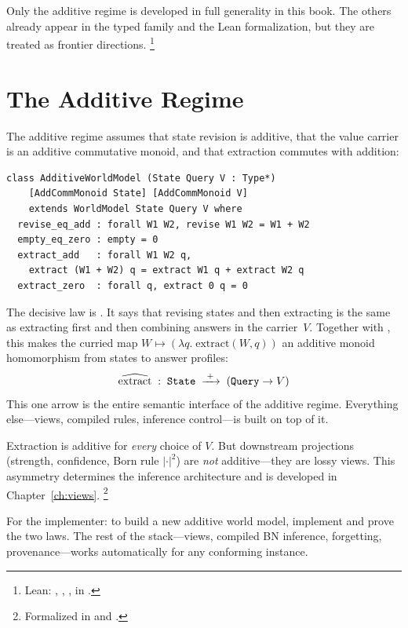 \documentclass[11pt,openany]{report}
\begin{document}
\noindent
Only the additive regime is developed in full generality in this book.
The others already appear in the typed family and the Lean
formalization, but they are treated as frontier directions.%
\footnote{Lean: , ,
,  in
.}


\section{The Additive Regime}
\label{sec:additive-regime}

The additive regime assumes that state revision is additive, that the
value carrier is an additive commutative monoid, and that extraction
commutes with addition:

\begin{lstlisting}[language={}]
class AdditiveWorldModel (State Query V : Type*)
    [AddCommMonoid State] [AddCommMonoid V]
    extends WorldModel State Query V where
  revise_eq_add : forall W1 W2, revise W1 W2 = W1 + W2
  empty_eq_zero : empty = 0
  extract_add   : forall W1 W2 q,
    extract (W1 + W2) q = extract W1 q + extract W2 q
  extract_zero  : forall q, extract 0 q = 0
\end{lstlisting}

\noindent
The decisive law is .  It says that revising states
and then extracting is the same as extracting first and then combining
answers in the carrier~$V$.  Together with , this
makes the curried map
$W \mapsto (\lambda q.\; \mathrm{extract}(W, q))$ an additive monoid
homomorphism from states to answer profiles:
\[
  \widehat{\mathrm{extract}} \;:\;
  \texttt{State} \;\xrightarrow{\;+\;}\;
  (\texttt{Query} \to V)
\]
This one arrow is the entire semantic interface of the additive regime.
Everything else---views, compiled rules, inference control---is built
on top of it.

Extraction is additive for \emph{every} choice of $V$.  But downstream
projections (strength, confidence, Born rule $|\cdot|^2$) are
\emph{not} additive---they are lossy views.  This asymmetry determines
the inference architecture and is developed in
Chapter~\ref{ch:views}.%
\footnote{Formalized in
and .}

For the implementer: to build a new additive world model, implement
 and prove the two laws.  The rest of the stack---views,
compiled BN inference, forgetting, provenance---works automatically for
any conforming instance.
\end{document}
